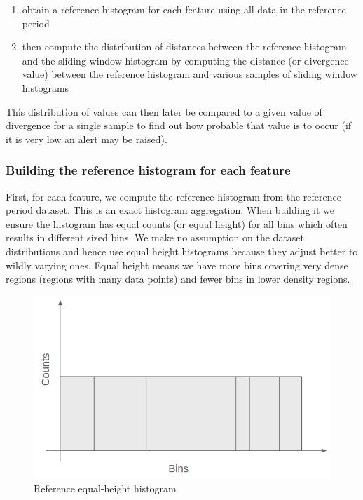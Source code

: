 \begin{enumerate}
    \item obtain a reference histogram for each feature using all data in the reference period
    
    \item then compute the distribution of distances between the reference histogram and the sliding window histogram by computing the distance (or divergence value) between the reference histogram and various samples of sliding window histograms
\end{enumerate}

This distribution of values can then later be compared to a given value of divergence for a single sample to find out how probable that value is to occur (if it is very low an alert may be raised).

\subsubsection*{Building the reference histogram for each feature}

First, for each feature, we compute the reference histogram from the reference period dataset. This is an exact histogram aggregation. When building it we ensure the histogram has equal counts (or equal height) for all bins which often results in different sized bins. We make no assumption on the dataset distributions and hence use equal height histograms because they adjust better to wildly varying ones. Equal height means we have more bins covering very dense regions (regions with many data points) and fewer bins in lower density regions. 

\begin{figure}[!htb]
    \begin{center}
      \includegraphics[scale=0.4]{figures/ref-hist.png}
      \caption[]{Reference equal-height histogram}
      \label{fig:ref-hist}
    \end{center}
\end{figure}


